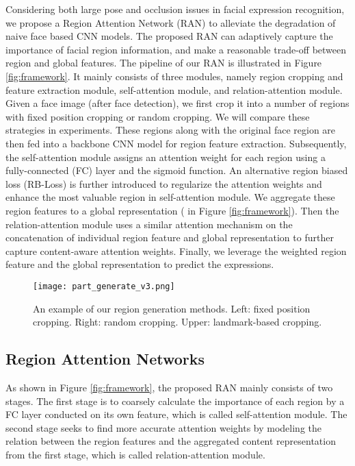 \documentclass[journal]{IEEEtran}
\begin{document}
Considering both large pose and occlusion issues in facial expression recognition, we propose a Region Attention Network (RAN) to alleviate the degradation of naive face based CNN models. The proposed RAN can adaptively capture the importance of facial region information, and make a reasonable trade-off between region and global features. The pipeline of our RAN is illustrated in Figure \ref{fig:framework}. It mainly consists of three modules, namely region cropping and feature extraction module, self-attention module, and relation-attention module. Given a face image (after face detection), we first crop it into a number of regions with fixed position cropping or random cropping. We will compare these strategies in experiments. These regions along with the original face region are then fed into a backbone CNN model for region feature extraction. Subsequently, the self-attention module assigns an attention weight for each region using a fully-connected (FC) layer and the sigmoid function. An alternative region biased loss (RB-Loss) is further introduced to regularize the attention weights and enhance the most valuable region in self-attention module. We aggregate these region features to a global representation ( in Figure \ref{fig:framework}). Then the relation-attention module uses a similar attention mechanism on the concatenation of individual region feature and global representation to further capture content-aware attention weights.
Finally, we leverage the weighted region feature and the global representation to predict the expressions.





\begin{figure*}[!t]
\centering
\texttt{[image: part\_generate\_v3.png]}
\caption{An example of our region generation methods. Left: fixed position cropping. Right: random cropping. Upper: landmark-based cropping.}
\label{fig:get_region}
\end{figure*}



\subsection{Region Attention Networks}
As shown in Figure \ref{fig:framework}, the proposed RAN mainly consists of two stages. The first stage is to coarsely calculate the importance of each region by a FC layer conducted on its own feature, which is called self-attention module. The second stage seeks to find more accurate attention weights by modeling the relation between the region features and the aggregated content representation from the first stage, which is called relation-attention module. 
\end{document}
